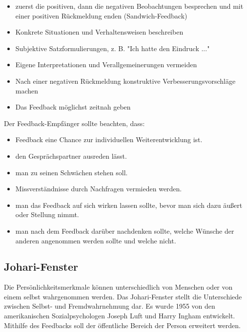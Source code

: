 \begin{itemize}
    \item zuerst die positiven, dann die negativen Beobachtungen besprechen und mit einer positiven Rückmeldung enden (Sandwich-Feedback)
    \item Konkrete Situationen und Verhaltensweisen beschreiben
    \item Subjektive Satzformulierungen, z. B. "Ich hatte den Eindruck ..."
    \item Eigene Interpretationen und Verallgemeinerungen vermeiden
    \item Nach einer negativen Rückmeldung konstruktive Verbesserungsvorschläge machen
    \item Das Feedback möglichst zeitnah geben
\end{itemize}

Der Feedback-Empfänger sollte beachten, dass:
\begin{itemize}
    \item Feedback eine Chance zur individuellen Weiterentwicklung ist.
    \item den Gesprächspartner ausreden lässt.
    \item man zu seinen Schwächen stehen soll.
    \item Missverständnisse durch Nachfragen vermieden werden.
    \item man das Feedback auf sich wirken lassen sollte, bevor man sich dazu äußert oder Stellung nimmt.
    \item man nach dem Feedback darüber nachdenken sollte, welche Wünsche der anderen angenommen werden sollte und welche nicht.
\end{itemize}

\subsection{Johari-Fenster}
Die Persönlichkeitsmerkmale können unterschiedlich von Menschen oder von einem selbst wahrgenommen werden.
Das Johari-Fenster stellt die Unterschiede zwischen Selbst- und Fremdwahrnehmung dar. 
Es wurde 1955 von den amerikanischen Sozialpsychologen Joseph Luft und Harry Ingham entwickelt. Mithilfe des 
Feedbacks soll der öffentliche Bereich der Person erweitert werden.

